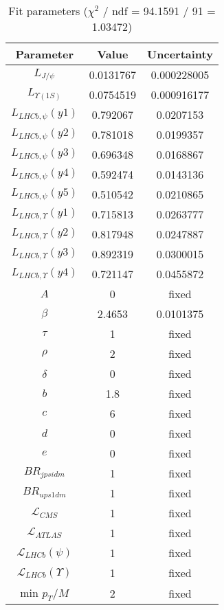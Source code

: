 \begin{table}
\centering
\begin{tabular}{c|c|c}
Parameter & Value & Uncertainty \\
\hline
$L_{J/\psi}$ & 0.0131767 & 0.000228005 \\
$L_{\Upsilon(1S)}$ & 0.0754519 & 0.000916177 \\
$L_{LHCb,\psi}(y1)$ & 0.792067 & 0.0207153 \\
$L_{LHCb,\psi}(y2)$ & 0.781018 & 0.0199357 \\
$L_{LHCb,\psi}(y3)$ & 0.696348 & 0.0168867 \\
$L_{LHCb,\psi}(y4)$ & 0.592474 & 0.0143136 \\
$L_{LHCb,\psi}(y5)$ & 0.510542 & 0.0210865 \\
$L_{LHCb,\Upsilon}(y1)$ & 0.715813 & 0.0263777 \\
$L_{LHCb,\Upsilon}(y2)$ & 0.817948 & 0.0247887 \\
$L_{LHCb,\Upsilon}(y3)$ & 0.892319 & 0.0300015 \\
$L_{LHCb,\Upsilon}(y4)$ & 0.721147 & 0.0455872 \\
$A$ & 0 & fixed \\
$\beta$ & 2.4653 & 0.0101375 \\
$\tau$ & 1 & fixed \\
$\rho$ & 2 & fixed \\
$\delta$ & 0 & fixed \\
$b$ & 1.8 & fixed \\
$c$ & 6 & fixed \\
$d$ & 0 & fixed \\
$e$ & 0 & fixed \\
$BR_{jpsidm}$ & 1 & fixed \\
$BR_{ups1dm}$ & 1 & fixed \\
$\mathcal L_{CMS}$ & 1 & fixed \\
$\mathcal L_{ATLAS}$ & 1 & fixed \\
$\mathcal L_{LHCb}(\psi)$ & 1 & fixed \\
$\mathcal L_{LHCb}(\Upsilon)$ & 1 & fixed \\
min $p_T/M$ & 2 & fixed \\
\end{tabular}
\caption{Fit parameters ($\chi^2$ / ndf = 94.1591 / 91 = 1.03472)}
\end{table}
